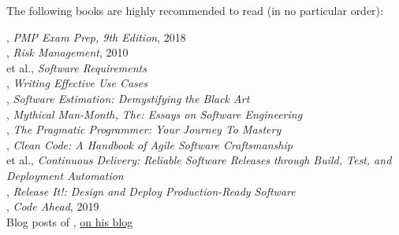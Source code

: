 \documentclass[nobrand,anonymous,nodate,nosecurity]{huawei}
\begin{document}
The following books are highly recommended to read (in no particular order):

\begin{multicols}{2}\small\raggedright
{}, \emph{PMP Exam Prep, 9th Edition}, 2018\\[3pt]
, \emph{Risk Management}, 2010\\[3pt]
 et al., \emph{Software Requirements}\\[3pt]
, \emph{Writing Effective Use Cases}\\[3pt]
, \emph{Software Estimation: Demystifying the Black Art}\\[3pt]
, \emph{Mythical Man-Month, The: Essays on Software Engineering}\\[3pt]
, \emph{The Pragmatic Programmer: Your Journey To Mastery}\\[3pt]
, \emph{Clean Code: A Handbook of Agile Software Craftsmanship}\\[3pt]
 et al., \emph{Continuous Delivery: Reliable Software Releases through Build, Test, and Deployment Automation}\\[3pt]
, \emph{Release It!: Design and Deploy Production-Ready Software}\\[3pt]
, \emph{Code Ahead}, 2019\\[3pt]
Blog posts of , \href{https://www.yegor256.com/tag/management}{on his blog}\\[3pt]
\end{multicols}
\end{document}
